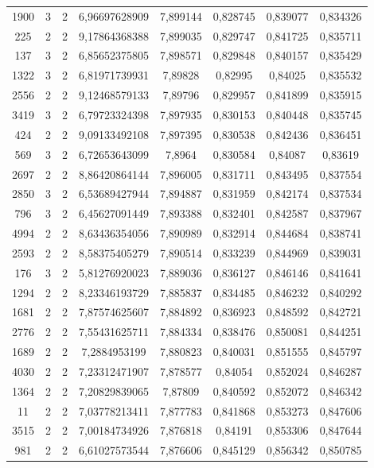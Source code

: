 \begin{longtable}{|c|c|c|c|c|c|c|c|}
1900 & 3 & 2 & 6,96697628909 & 7,899144 & 0,828745 & 0,839077 & 0,834326 \\
225 & 2 & 2 & 9,17864368388 & 7,899035 & 0,829747 & 0,841725 & 0,835711 \\
137 & 3 & 2 & 6,85652375805 & 7,898571 & 0,829848 & 0,840157 & 0,835429 \\
1322 & 3 & 2 & 6,81971739931 & 7,89828 & 0,82995 & 0,84025 & 0,835532 \\
2556 & 2 & 2 & 9,12468579133 & 7,89796 & 0,829957 & 0,841899 & 0,835915 \\
3419 & 3 & 2 & 6,79723324398 & 7,897935 & 0,830153 & 0,840448 & 0,835745 \\
424 & 2 & 2 & 9,09133492108 & 7,897395 & 0,830538 & 0,842436 & 0,836451 \\
569 & 3 & 2 & 6,72653643099 & 7,8964 & 0,830584 & 0,84087 & 0,83619 \\
2697 & 2 & 2 & 8,86420864144 & 7,896005 & 0,831711 & 0,843495 & 0,837554 \\
2850 & 3 & 2 & 6,53689427944 & 7,894887 & 0,831959 & 0,842174 & 0,837534 \\
796 & 3 & 2 & 6,45627091449 & 7,893388 & 0,832401 & 0,842587 & 0,837967 \\
4994 & 2 & 2 & 8,63436354056 & 7,890989 & 0,832914 & 0,844684 & 0,838741 \\
2593 & 2 & 2 & 8,58375405279 & 7,890514 & 0,833239 & 0,844969 & 0,839031 \\
176 & 3 & 2 & 5,81276920023 & 7,889036 & 0,836127 & 0,846146 & 0,841641 \\
1294 & 2 & 2 & 8,23346193729 & 7,885837 & 0,834485 & 0,846232 & 0,840292 \\
1681 & 2 & 2 & 7,87574625607 & 7,884892 & 0,836923 & 0,848592 & 0,842721 \\
2776 & 2 & 2 & 7,55431625711 & 7,884334 & 0,838476 & 0,850081 & 0,844251 \\
1689 & 2 & 2 & 7,2884953199 & 7,880823 & 0,840031 & 0,851555 & 0,845797 \\
4030 & 2 & 2 & 7,23312471907 & 7,878577 & 0,84054 & 0,852024 & 0,846287 \\
1364 & 2 & 2 & 7,20829839065 & 7,87809 & 0,840592 & 0,852072 & 0,846342 \\
11 & 2 & 2 & 7,03778213411 & 7,877783 & 0,841868 & 0,853273 & 0,847606 \\
3515 & 2 & 2 & 7,00184734926 & 7,876818 & 0,84191 & 0,853306 & 0,847644 \\
981 & 2 & 2 & 6,61027573544 & 7,876606 & 0,845129 & 0,856342 & 0,850785 \\

\end{longtable}
